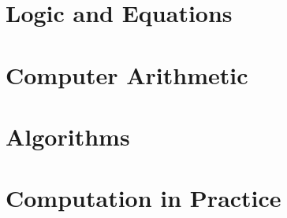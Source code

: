 \documentclass[7x9,hyper]{newmath}
\begin{document}



\part{Logic and Equations}







\part{Computer Arithmetic}





\part{Algorithms}






\part{Computation in Practice}





\endmatter

\printindex
\end{document}
